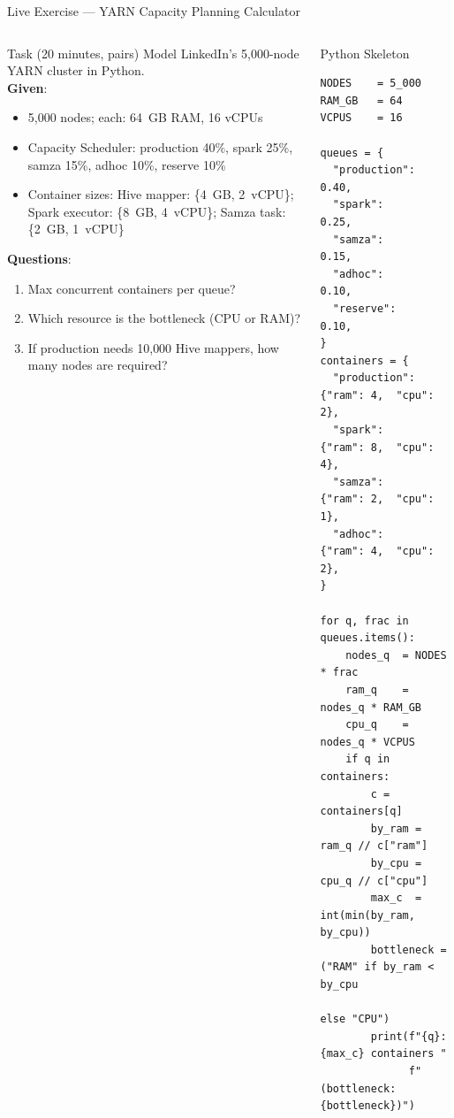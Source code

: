 \documentclass[aspectratio=169,10pt]{beamer}
\begin{document}
\begin{frame}[fragile]{Live Exercise — YARN Capacity Planning Calculator}
  \begin{columns}[T]
      \begin{block}{Task (20 minutes, pairs)}
        Model LinkedIn's 5{,}000-node YARN cluster in Python.\\[5pt]
        \textbf{Given}:
        \begin{itemize}\setlength\itemsep{1pt}
          \item 5{,}000 nodes; each: 64~GB RAM, 16 vCPUs
          \item Capacity Scheduler: production 40\%,
                spark 25\%, samza 15\%, adhoc 10\%, reserve 10\%
          \item Container sizes:
                Hive mapper: \{4~GB, 2~vCPU\};
                Spark executor: \{8~GB, 4~vCPU\};
                Samza task: \{2~GB, 1~vCPU\}
        \end{itemize}
        \textbf{Questions}:
        \begin{enumerate}\setlength\itemsep{1pt}
          \item Max concurrent containers per queue?
          \item Which resource is the bottleneck (CPU or RAM)?
          \item If production needs 10{,}000 Hive mappers,
                how many nodes are required?
        \end{enumerate}
      \end{block}

      \begin{exampleblock}{Python Skeleton}
        \scriptsize
        \begin{verbatim}
NODES    = 5_000
RAM_GB   = 64
VCPUS    = 16

queues = {
  "production": 0.40,
  "spark":      0.25,
  "samza":      0.15,
  "adhoc":      0.10,
  "reserve":    0.10,
}
containers = {
  "production": {"ram": 4,  "cpu": 2},
  "spark":      {"ram": 8,  "cpu": 4},
  "samza":      {"ram": 2,  "cpu": 1},
  "adhoc":      {"ram": 4,  "cpu": 2},
}

for q, frac in queues.items():
    nodes_q  = NODES * frac
    ram_q    = nodes_q * RAM_GB
    cpu_q    = nodes_q * VCPUS
    if q in containers:
        c = containers[q]
        by_ram = ram_q // c["ram"]
        by_cpu = cpu_q // c["cpu"]
        max_c  = int(min(by_ram, by_cpu))
        bottleneck = ("RAM" if by_ram < by_cpu
                             else "CPU")
        print(f"{q}: {max_c} containers "
              f"(bottleneck: {bottleneck})")
        \end{verbatim}
      \end{exampleblock}
  \end{columns}
\end{frame}
\end{document}
